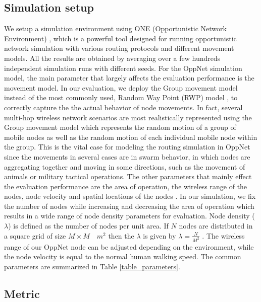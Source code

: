 \subsection{Simulation setup}
We setup a simulation environment using ONE (Opportunistic Network Environment) \cite{Keranen2009b}, which is a powerful tool designed for running opportunistic network simulation with various routing protocols and different movement models.
All the results are obtained by averaging over a few hundreds independent simulation runs with different seeds.
For the OppNet simulation model, the main parameter that largely affects the evaluation performance is the movement model.
In our evaluation, we deploy the Group movement model instead of the most commonly used, Random Way Point (RWP) model \cite{Batabyal2012}, to correctly capture the the actual behavior of node movements.
In fact, several multi-hop wireless network scenarios are most realistically represented using the Group movement model \cite{Blakely2004} which represents the random motion of a group of mobile nodes as well as the random motion of each individual mobile node within the group.
This is the vital case for modeling the routing simulation in OppNet since the movements in several cases are in swarm behavior, in which nodes are aggregating together and moving in some directions, such as the movement of animals or military tactical operations.
The other parameters that mainly effect the evaluation performance are the area of operation, the wireless range of the nodes, node velocity and spatial locations of the nodes \cite{Batabyal2012}. 
In our simulation, we fix the number of nodes while increasing and decreasing the area of operation which results in a wide range of node density parameters for evaluation.
Node density ($\lambda$) is defined as the number of nodes per unit area. 
If $N$ nodes are distributed in a square grid of size $M \times M \quad{ m }^{ 2 }$ then the $\lambda$ is given by $\lambda =\frac { N }{ { M }^{ 2 } } $ . 
The wireless range of our OppNet node can be adjusted depending on the environment, while the node velocity is equal to the normal human walking speed.
The common parameters are summarized in Table \ref{table_parameters}.

\subsection{Metric}

